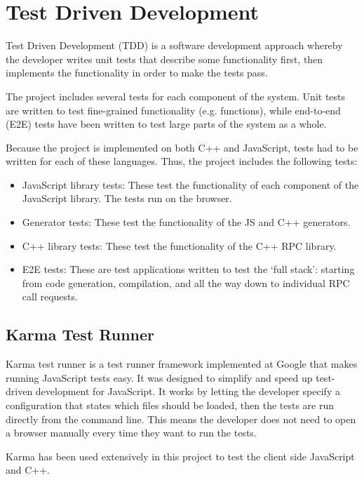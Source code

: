 \section{Test Driven Development} %
\label{sec:test_driven_development}
Test Driven Development (TDD) is a software development approach whereby the developer writes unit tests that describe some functionality first, then implements the functionality in order to make the tests pass.

The project includes several tests for each component of the system. Unit tests are written to test fine-grained functionality (e.g. functions), while end-to-end (E2E) tests have been written to test large parts of the system as a whole.

Because the project is implemented on both C++ and JavaScript, tests had to be written for each of these languages. Thus, the project includes the following tests:

\begin{itemize}
	\item JavaScript library tests: These test the functionality of each component of the JavaScript library. The tests run on the browser.
	\item Generator tests: These test the functionality of the JS and C++ generators.
	\item C++ library tests: These test the functionality of the C++ RPC library.
	\item E2E tests: These are test applications written to test the `full stack': starting from code generation, compilation, and all the way down to individual RPC call requests.
\end{itemize}

\subsection{Karma Test Runner} %
\label{sub:karma_test_runner}
Karma test runner\cite{karmarunner} is a test runner framework implemented at Google that makes running JavaScript tests easy. It was designed to simplify and speed up test-driven development for JavaScript. It works by letting the developer specify a configuration that states which files should be loaded, then the tests are run directly from the command line. This means the developer does not need to open a browser manually every time they want to run the tests.

Karma has been used extensively in this project to test the client side JavaScript and C++.

